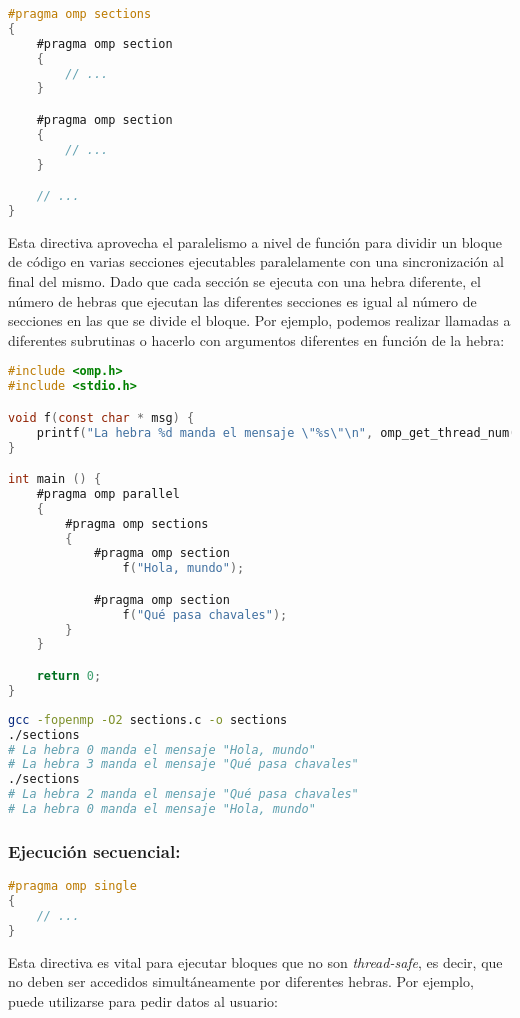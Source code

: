 \begin{lstlisting}[language=C]
#pragma omp sections
{
	#pragma omp section
	{
		// ...
	}

	#pragma omp section
	{
		// ...
	}

	// ...
}
\end{lstlisting}

Esta directiva aprovecha el paralelismo a nivel de función para dividir un bloque de código en varias secciones ejecutables paralelamente con una sincronización al final del mismo.
Dado que cada sección se ejecuta con una hebra diferente, el número de hebras que ejecutan las diferentes secciones es igual al número de secciones en las que se divide el bloque.
Por ejemplo, podemos realizar llamadas a diferentes subrutinas o hacerlo con argumentos diferentes en función de la hebra:

\begin{lstlisting}[language=C]
#include <omp.h>
#include <stdio.h>

void f(const char * msg) {
	printf("La hebra %d manda el mensaje \"%s\"\n", omp_get_thread_num(), msg);
}

int main () {
	#pragma omp parallel
	{
		#pragma omp sections
		{
			#pragma omp section
				f("Hola, mundo");

			#pragma omp section
				f("Qué pasa chavales");
		}
	}

	return 0;
}
\end{lstlisting}

\begin{lstlisting}[language=sh]
gcc -fopenmp -O2 sections.c -o sections
./sections
# La hebra 0 manda el mensaje "Hola, mundo"
# La hebra 3 manda el mensaje "Qué pasa chavales"
./sections
# La hebra 2 manda el mensaje "Qué pasa chavales"
# La hebra 0 manda el mensaje "Hola, mundo"
\end{lstlisting}

\subsubsection{Ejecución secuencial: }

\begin{lstlisting}[language=C]
#pragma omp single
{
	// ...
}
\end{lstlisting}

Esta directiva es vital para ejecutar bloques que no son \textit{thread-safe}, es decir, que no deben ser accedidos simultáneamente por diferentes hebras.
Por ejemplo, puede utilizarse para pedir datos al usuario:

